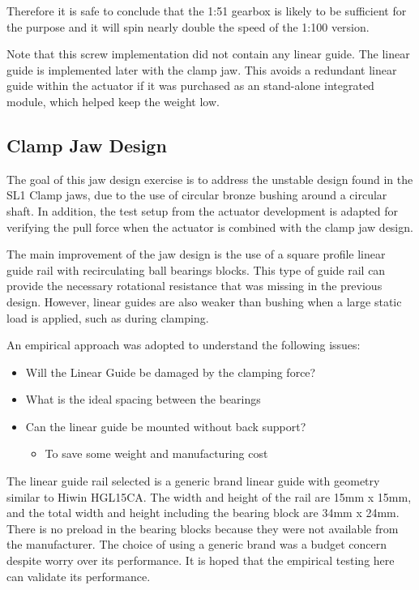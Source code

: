Therefore it is safe to conclude that the 1:51 gearbox is likely to be sufficient for the purpose and it will spin nearly double the speed of the 1:100 version.

Note that this screw implementation did not contain any linear guide. The linear guide is implemented later with the clamp jaw. This avoids a redundant linear guide within the actuator if it was purchased as an stand-alone integrated module, which helped keep the weight low.  

\subsection{Clamp Jaw Design}
\label{subsection:exploration-2-clamp-jaw-design}

The goal of this jaw design exercise is to address the unstable design found in the SL1 Clamp jaws, due to the use of circular bronze bushing around a circular shaft. In addition, the test setup from the actuator development is adapted for verifying the pull force when the actuator is combined with the clamp jaw design.

The main improvement of the jaw design is the use of a square profile linear guide rail with recirculating ball bearings blocks. This type of guide rail can provide the necessary rotational resistance that was missing in the previous design. However, linear guides are also weaker than bushing when a large static load is applied, such as during clamping.

An empirical approach was adopted to understand the following issues:
\begin{itemize}
    \item Will the Linear Guide be damaged by the clamping force?
    \item What is the ideal spacing between the bearings
    \item Can the linear guide be mounted without back support?
    \begin{itemize}
      \item To save some weight and manufacturing cost
    \end{itemize}
\end{itemize}

    The linear guide rail selected is a generic brand linear guide with geometry similar to Hiwin HGL15CA. The width and height of the rail are 15mm x 15mm, and the total width and height including the bearing block are 34mm x 24mm. There is no preload in the bearing blocks because they were not available from the manufacturer. The choice of using a generic brand was a budget concern despite worry over its performance. It is hoped that the empirical testing here can validate its performance.

